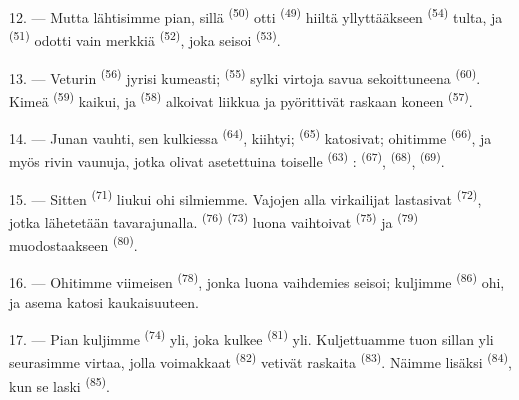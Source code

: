 12. --- Mutta lähtisimme pian, sillä  \textsuperscript{(50)}
otti  \textsuperscript{(49)} hiiltä yllyttääkseen
 \textsuperscript{(54)} tulta, ja 
\textsuperscript{(51)} odotti vain merkkiä 
\textsuperscript{(52)}, joka seisoi  \textsuperscript{(53)}.

13. --- Veturin  \textsuperscript{(56)} jyrisi kumeasti;
 \textsuperscript{(55)} sylki virtoja savua sekoittuneena
 \textsuperscript{(60)}. Kimeä 
\textsuperscript{(59)} kaikui, ja  \textsuperscript{(58)}
alkoivat liikkua ja pyörittivät raskaan koneen 
\textsuperscript{(57)}.

\VUsaut{3.0mm}
\VUsaut{3.0mm}

14. --- Junan vauhti, sen kulkiessa  \textsuperscript{(64)},
kiihtyi;  \textsuperscript{(65)} katosivat; ohitimme
 \textsuperscript{(66)}, ja myös rivin vaunuja, jotka olivat
asetettuina toiselle  \textsuperscript{(63)} :
 \textsuperscript{(67)}, 
\textsuperscript{(68)},  \textsuperscript{(69)}.


15. --- Sitten  \textsuperscript{(71)} liukui ohi silmiemme.
Vajojen alla virkailijat lastasivat  \textsuperscript{(72)},
jotka lähetetään tavarajunalla.  \textsuperscript{(76)}
 \textsuperscript{(73)} luona vaihtoivat
 \textsuperscript{(75)} ja 
\textsuperscript{(79)} muodostaakseen 
\textsuperscript{(80)}.

16. --- Ohitimme viimeisen  \textsuperscript{(78)}, jonka luona
vaihdemies seisoi; kuljimme  \textsuperscript{(86)} ohi, ja
asema katosi kaukaisuuteen.

17. --- Pian kuljimme  \textsuperscript{(74)} yli, joka
kulkee  \textsuperscript{(81)} yli. Kuljettuamme tuon sillan yli
seurasimme virtaa, jolla voimakkaat  \textsuperscript{(82)}
vetivät raskaita  \textsuperscript{(83)}. Näimme lisäksi
 \textsuperscript{(84)}, kun se laski
 \textsuperscript{(85)}.

